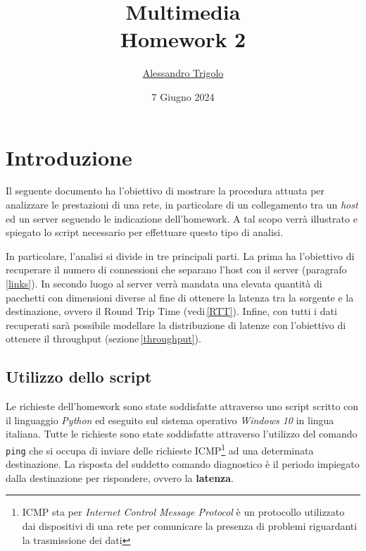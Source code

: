 \title{\vspace{160px} \textbf{\huge{Multimedia}} \\\vspace{17.5px} \LARGE{Homework 2}  \vspace{10px}}
\author{\href{https://github.com/imAlessas}{Alessandro Trigolo}}
\date{7 Giugno 2024}



\maketitle\newpage

\tableofcontents
\vspace{50px}
\listoffigures
\newpage


\section{Introduzione}

Il seguente documento ha l'obiettivo di mostrare la procedura attuata per analizzare le prestazioni di una rete, in particolare di un collegamento tra un \textsl{host} ed un server seguendo le indicazione dell'homework. A tal scopo verrà illustrato e spiegato lo script necessario per effettuare questo tipo di analisi. 

In particolare, l'analisi si divide in tre principali parti. La prima ha l'obiettivo di recuperare il numero di connessioni che separano l'host con il server (paragrafo\,\ref{links}). In secondo luogo al server verrà mandata una elevata quantità di pacchetti con dimensioni diverse al fine di ottenere la latenza tra la sorgente e la destinazione, ovvero il Round Trip Time (vedi\,\ref{RTT}). Infine, con tutti i dati recuperati sarà possibile modellare la distribuzione di latenze con l'obiettivo di ottenere il throughput (sezione\,\ref{throughput}).

\vspace{10px}\subsection{Utilizzo dello script}

Le richieste dell'homework sono state soddisfatte attraverso uno script scritto con il linguaggio \textsl{Python} ed eseguito sul sistema operativo \textsl{Windows 10} in lingua italiana. Tutte le richieste sono state soddisfatte attraverso l'utilizzo del comando \texttt{ping} che si occupa di inviare delle richieste ICMP\footnote{ICMP sta per \textsl{Internet Control Message Protocol} è un protocollo utilizzato dai dispositivi di una rete per comunicare la presenza di problemi riguardanti la trasmissione dei dati} ad una determinata destinazione. La risposta del suddetto comando diagnostico è il periodo impiegato dalla destinazione per rispondere, ovvero la \textbf{latenza}.

